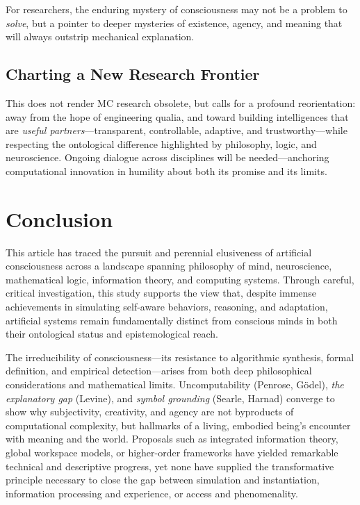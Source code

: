 For researchers, the enduring mystery of consciousness may not be a problem to \emph{solve}, but a pointer to deeper mysteries of existence, agency, and meaning that will always outstrip mechanical explanation.

\subsection{Charting a New Research Frontier}
\label{subsec:new_research_frontier}

This does not render MC research obsolete, but calls for a profound reorientation: away from the hope of engineering qualia, and toward building intelligences that are \emph{useful partners}---transparent, controllable, adaptive, and trustworthy---while respecting the ontological difference highlighted by philosophy, logic, and neuroscience. Ongoing dialogue across disciplines will be needed---anchoring computational innovation in humility about both its promise and its limits.


\section{Conclusion}
\label{sec:conclusion}

This article has traced the pursuit and perennial elusiveness of artificial consciousness across a landscape spanning philosophy of mind, neuroscience, mathematical logic, information theory, and computing systems. Through careful, critical investigation, this study supports the view that, despite immense achievements in simulating self-aware behaviors, reasoning, and adaptation, artificial systems remain fundamentally distinct from conscious minds in both their ontological status and epistemological reach.

The irreducibility of consciousness---its resistance to algorithmic synthesis, formal definition, and empirical detection---arises from both deep philosophical considerations and mathematical limits. Uncomputability (Penrose, Gödel), \emph{the explanatory gap} (Levine), and \emph{symbol grounding} (Searle, Harnad) converge to show why subjectivity, creativity, and agency are not byproducts of computational complexity, but hallmarks of a living, embodied being's encounter with meaning and the world. Proposals such as integrated information theory, global workspace models, or higher-order frameworks have yielded remarkable technical and descriptive progress, yet none have supplied the transformative principle necessary to close the gap between simulation and instantiation, information processing and experience, or access and phenomenality.

